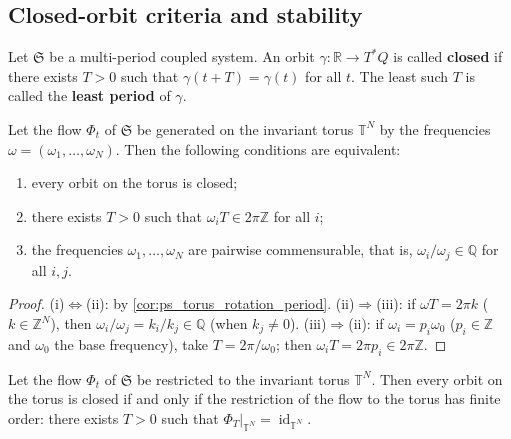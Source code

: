 \subsection{Closed-orbit criteria and stability}\label{subsec:ps_closed_orbit}

\begin{definition}\label{def:ps_closed_orbit}
Let $\mathfrak{S}$ be a multi-period coupled system. An orbit $\gamma:\mathbb{R}\to T^*Q$ is called \textbf{closed} if there exists $T>0$ such that $\gamma(t+T)=\gamma(t)$ for all $t$. The least such $T$ is called the \textbf{least period} of $\gamma$.
\end{definition}

\begin{theorem}\label{thm:ps_closed_orbit_criterion}
Let the flow $\Phi_t$ of $\mathfrak{S}$ be generated on the invariant torus $\mathbb{T}^N$ by the frequencies $\omega=(\omega_1,\dots,\omega_N)$. Then the following conditions are equivalent:
\begin{enumerate}[label=(\roman*)]
    \item every orbit on the torus is closed;
    \item there exists $T>0$ such that $\omega_i T\in 2\pi\mathbb{Z}$ for all $i$;
    \item the frequencies $\omega_1,\dots,\omega_N$ are pairwise commensurable, that is, $\omega_i/\omega_j\in\mathbb{Q}$ for all $i,j$.
\end{enumerate}
\end{theorem}

\begin{proof}
(i)$\Leftrightarrow$(ii): by \cref{cor:ps_torus_rotation_period}. (ii)$\Rightarrow$(iii): if $\omega T = 2\pi k$ ($k\in\mathbb{Z}^N$), then $\omega_i/\omega_j = k_i/k_j\in\mathbb{Q}$ (when $k_j\neq 0$). (iii)$\Rightarrow$(ii): if $\omega_i = p_i\omega_0$ ($p_i\in\mathbb{Z}$ and $\omega_0$ the base frequency), take $T = 2\pi/\omega_0$; then $\omega_i T = 2\pi p_i\in 2\pi\mathbb{Z}$.
\end{proof}

\begin{corollary}\label{cor:ps_closed_orbit_finite_order}
Let the flow $\Phi_t$ of $\mathfrak{S}$ be restricted to the invariant torus $\mathbb{T}^N$. Then every orbit on the torus is closed if and only if the restriction of the flow to the torus has finite order: there exists $T>0$ such that $\Phi_T|_{\mathbb{T}^N} = \operatorname{id}_{\mathbb{T}^N}$.
\end{corollary}

